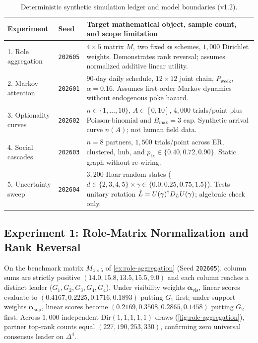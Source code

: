 \begin{table}[htbp]
\centering
\small
\caption{Deterministic synthetic simulation ledger and model boundaries (v1.2).}
\label{tab:seeds}
\begin{tabularx}{\textwidth}{@{}llL@{}}
\toprule
Experiment & Seed & Target mathematical object, sample count, and scope limitation \\
. Role aggregation & \texttt{202605} & $4\times 5$ matrix $M$, two fixed $\boldsymbol{\alpha}$ schemes, $1{,}000$ Dirichlet weights. Demonstrates rank reversal; assumes normalized additive linear utility. \\
2. Markov attention & \texttt{202601} & $90$-day daily schedule, $12\times 12$ joint chain, $P_{\mathrm{week}}$, $\alpha=0.16$. Assumes first-order Markov dynamics without endogenous poke hazard. \\
3. Optionality curves & \texttt{202602} & $n \in \{1,\dots,10\}$, $A \in [0,10]$, $4{,}000$ trials/point plus Poisson-binomial and $B_{\max}=3$ cap. Synthetic arrival curve $n(A)$; not human field data. \\
4. Social cascades & \texttt{202603} & $n=8$ partners, $1{,}500$ trials/point across ER, clustered, hub, and $p_{\mathrm{tx}} \in \{0.40,0.72,0.90\}$. Static graph without re-wiring. \\
5. Uncertainty sweep & \texttt{202604} & $3{,}200$ Haar-random states ($d \in \{2,3,4,5\} \times \gamma \in \{0.0,0.25,0.75,1.5\}$). Tests unitary rotation $\hat{L} = U(\gamma)^\dagger D_L U(\gamma)$; algebraic check only. \\
\bottomrule
\end{tabularx}
\end{table}

\subsection{Experiment 1: Role-Matrix Normalization and Rank Reversal}
\label{subsec:sim-role-agg}

On the benchmark matrix $M_{4\times 5}$ of \cref{ex:role-aggregation} (Seed \texttt{202605}),
column sums are strictly positive $(14.0, 15.8, 13.5, 15.5, 9.0)$ and each column reaches
a distinct leader ($G_1, G_2, G_3, G_4, G_4$). Under visibility weights
$\boldsymbol{\alpha}_{\mathrm{vis}}$, linear scores evaluate to $(0.4167, 0.2225, 0.1716, 0.1893)$
putting $G_1$ first; under support weights $\boldsymbol{\alpha}_{\mathrm{sup}}$, linear scores
become $(0.2169, 0.3508, 0.2865, 0.1458)$ putting $G_2$ first. Across $1{,}000$ independent
$\mathrm{Dir}(1,1,1,1,1)$ draws (\cref{fig:role-aggregation}), partner top-rank counts equal
$(227, 190, 253, 330)$, confirming zero universal consensus leader on $\Delta^{4}$.

